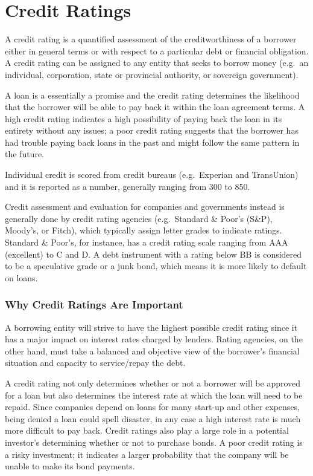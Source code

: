 \section{Credit Ratings}\label{credit-ratings}

A credit rating is a quantified assessment of the creditworthiness of a
borrower either in general terms or with respect to a particular debt or
financial obligation. A credit rating can be assigned to any entity that
seeks to borrow money (e.g.~an individual, corporation, state or
provincial authority, or sovereign government).

A loan is a essentially a promise and the credit rating determines the
likelihood that the borrower will be able to pay back it within the loan
agreement terms. A high credit rating indicates a high possibility of
paying back the loan in its entirety without any issues; a poor credit
rating suggests that the borrower has had trouble paying back loans in
the past and might follow the same pattern in the future.

Individual credit is scored from credit bureaus (e.g.~Experian and
TransUnion) and it is reported as a number, generally ranging from 300
to 850.

Credit assessment and evaluation for companies and governments instead
is generally done by credit rating agencies (e.g.~Standard \& Poor's
(S\&P), Moody's, or Fitch), which typically assign letter grades to
indicate ratings. Standard \& Poor's, for instance, has a credit rating
scale ranging from AAA (excellent) to C and D. A debt instrument with a
rating below BB is considered to be a speculative grade or a junk bond,
which means it is more likely to default on loans.

\subsubsection{Why Credit Ratings Are
Important}\label{why-credit-ratings-are-important}

A borrowing entity will strive to have the highest possible credit
rating since it has a major impact on interest rates charged by lenders.
Rating agencies, on the other hand, must take a balanced and objective
view of the borrower's financial situation and capacity to service/repay
the debt.

A credit rating not only determines whether or not a borrower will be
approved for a loan but also determines the interest rate at which the
loan will need to be repaid. Since companies depend on loans for many
start-up and other expenses, being denied a loan could spell disaster,
in any case a high interest rate is much more difficult to pay back.
Credit ratings also play a large role in a potential investor's
determining whether or not to purchase bonds. A poor credit rating is a
risky investment; it indicates a larger probability that the company
will be unable to make its bond payments.

